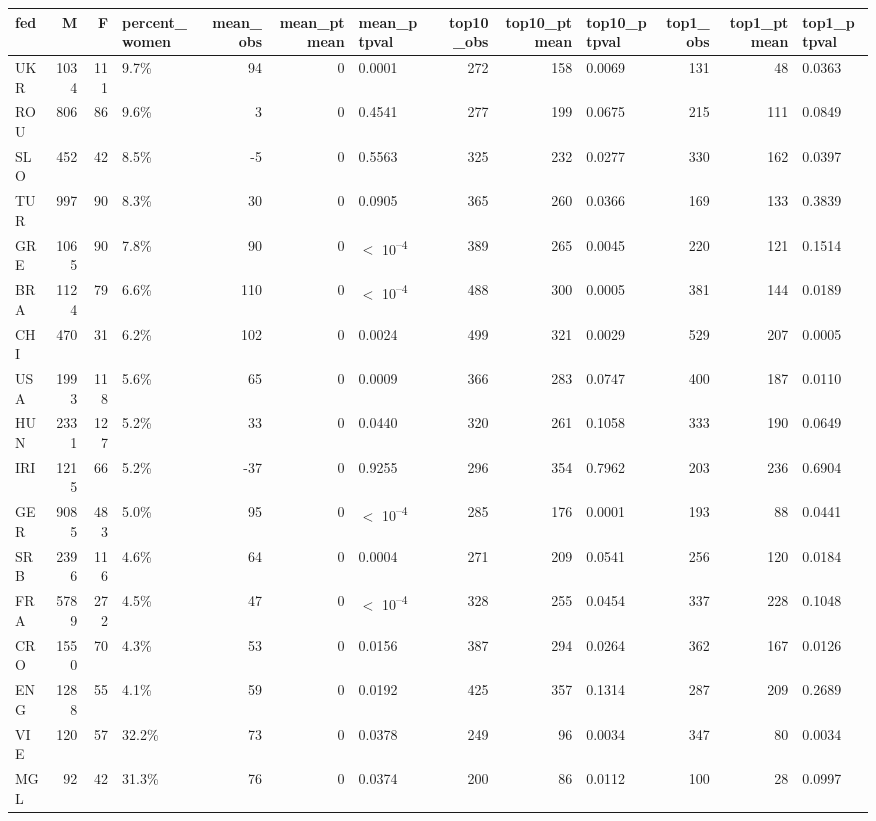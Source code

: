 
\begin{tabular}{l|r|r|l|r|r|l|r|r|l|r|r|l}
\hline
fed & M & F & percent_women & mean_obs & mean_ptmean & mean_ptpval & top10_obs & top10_ptmean & top10_ptpval & top1_obs & top1_ptmean & top1_ptpval\\
\hline
UKR & 1034 & 111 & 9.7\% & 94 & 0 & 0.0001 & 272 & 158 & 0.0069 & 131 & 48 & 0.0363\\
\hline
ROU & 806 & 86 & 9.6\% & 3 & 0 & 0.4541 & 277 & 199 & 0.0675 & 215 & 111 & 0.0849\\
\hline
SLO & 452 & 42 & 8.5\% & -5 & 0 & 0.5563 & 325 & 232 & 0.0277 & 330 & 162 & 0.0397\\
\hline
TUR & 997 & 90 & 8.3\% & 30 & 0 & 0.0905 & 365 & 260 & 0.0366 & 169 & 133 & 0.3839\\
\hline
GRE & 1065 & 90 & 7.8\% & 90 & 0 & $<$ 10\textsuperscript{--4} & 389 & 265 & 0.0045 & 220 & 121 & 0.1514\\
\hline
BRA & 1124 & 79 & 6.6\% & 110 & 0 & $<$ 10\textsuperscript{--4} & 488 & 300 & 0.0005 & 381 & 144 & 0.0189\\
\hline
CHI & 470 & 31 & 6.2\% & 102 & 0 & 0.0024 & 499 & 321 & 0.0029 & 529 & 207 & 0.0005\\
\hline
USA & 1993 & 118 & 5.6\% & 65 & 0 & 0.0009 & 366 & 283 & 0.0747 & 400 & 187 & 0.0110\\
\hline
HUN & 2331 & 127 & 5.2\% & 33 & 0 & 0.0440 & 320 & 261 & 0.1058 & 333 & 190 & 0.0649\\
\hline
IRI & 1215 & 66 & 5.2\% & -37 & 0 & 0.9255 & 296 & 354 & 0.7962 & 203 & 236 & 0.6904\\
\hline
GER & 9085 & 483 & 5.0\% & 95 & 0 & $<$ 10\textsuperscript{--4} & 285 & 176 & 0.0001 & 193 & 88 & 0.0441\\
\hline
SRB & 2396 & 116 & 4.6\% & 64 & 0 & 0.0004 & 271 & 209 & 0.0541 & 256 & 120 & 0.0184\\
\hline
FRA & 5789 & 272 & 4.5\% & 47 & 0 & $<$ 10\textsuperscript{--4} & 328 & 255 & 0.0454 & 337 & 228 & 0.1048\\
\hline
CRO & 1550 & 70 & 4.3\% & 53 & 0 & 0.0156 & 387 & 294 & 0.0264 & 362 & 167 & 0.0126\\
\hline
ENG & 1288 & 55 & 4.1\% & 59 & 0 & 0.0192 & 425 & 357 & 0.1314 & 287 & 209 & 0.2689\\
\hline
VIE & 120 & 57 & 32.2\% & 73 & 0 & 0.0378 & 249 & 96 & 0.0034 & 347 & 80 & 0.0034\\
\hline
MGL & 92 & 42 & 31.3\% & 76 & 0 & 0.0374 & 200 & 86 & 0.0112 & 100 & 28 & 0.0997\\

\end{tabular}
